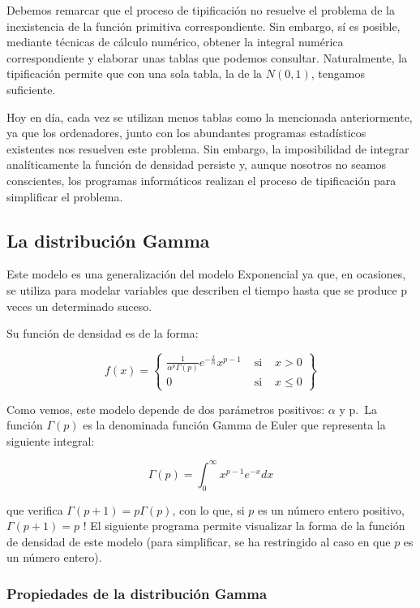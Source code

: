 \documentclass[
  a4paper,
  DIV=11,
  numbers=noendperiod]{scrreprt}
\begin{document}
Debemos remarcar que el proceso de tipificación no resuelve el problema
de la inexistencia de la función primitiva correspondiente. Sin embargo,
sí es posible, mediante técnicas de cálculo numérico, obtener la
integral numérica correspondiente y elaborar unas tablas que podemos
consultar. Naturalmente, la tipificación permite que con una sola tabla,
la de la \(N(0,1)\), tengamos suficiente.

Hoy en día, cada vez se utilizan menos tablas como la mencionada
anteriormente, ya que los ordenadores, junto con los abundantes
programas estadísticos existentes nos resuelven este problema. Sin
embargo, la imposibilidad de integrar analíticamente la función de
densidad persiste y, aunque nosotros no seamos conscientes, los
programas informáticos realizan el proceso de tipificación para
simplificar el problema.

\subsection{La distribución Gamma}\label{la-distribuciuxf3n-gamma}

Este modelo es una generalización del modelo Exponencial ya que, en
ocasiones, se utiliza para modelar variables que describen el tiempo
hasta que se produce p veces un determinado suceso.

Su función de densidad es de la forma:

\[
f(x)=\left\{\begin{array}{lll}
\frac{1}{\alpha^{p} \Gamma(p)} e^{-\frac{x}{\alpha}} x^{p-1} & \text { si } & x>0 \\
0 & \text { si } & x \leq 0
\end{array}\right\}
\]

Como vemos, este modelo depende de dos parámetros positivos: \(\alpha\)
y p.~La función \(\Gamma(p)\) es la denominada función Gamma de Euler
que representa la siguiente integral:

\[
\Gamma(p)=\int_{0}^{\infty} x^{p-1} e^{-x} d x
\]

que verifica \(\Gamma(p+1)=p \Gamma(p)\), con lo que, si \(p\) es un
número entero positivo, \(\Gamma(p+1)=p\) ! El siguiente programa
permite visualizar la forma de la función de densidad de este modelo
(para simplificar, se ha restringido al caso en que \(p\) es un número
entero).

\subsubsection{Propiedades de la distribución
Gamma}\label{propiedades-de-la-distribuciuxf3n-gamma}
\end{document}
